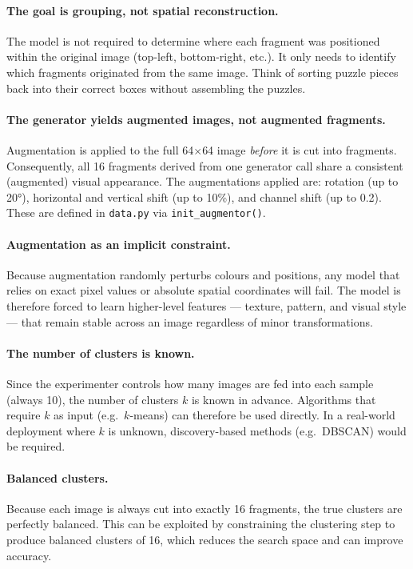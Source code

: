 \documentclass[12pt, a4paper]{article}
\begin{document}
\paragraph{The goal is grouping, not spatial reconstruction.}
The model is not required to determine where each fragment was positioned within the
original image (top-left, bottom-right, etc.). It only needs to identify which fragments
originated from the same image. Think of sorting puzzle pieces back into their correct
boxes without assembling the puzzles.

\paragraph{The generator yields augmented images, not augmented fragments.}
Augmentation is applied to the full 64$\times$64 image \emph{before} it is cut into
fragments. Consequently, all 16 fragments derived from one generator call share
a consistent (augmented) visual appearance. The augmentations applied are:
rotation (up to 20°), horizontal and vertical shift (up to 10\%), and channel shift
(up to 0.2). These are defined in \texttt{data.py} via \texttt{init\_augmentor()}.

\paragraph{Augmentation as an implicit constraint.}
Because augmentation randomly perturbs colours and positions, any model that relies on
exact pixel values or absolute spatial coordinates will fail. The model is therefore
forced to learn higher-level features — texture, pattern, and visual style — that
remain stable across an image regardless of minor transformations.

\paragraph{The number of clusters is known.}
Since the experimenter controls how many images are fed into each sample (always 10),
the number of clusters $k$ is known in advance. Algorithms that require $k$ as input
(e.g.\ $k$-means) can therefore be used directly. In a real-world deployment where
$k$ is unknown, discovery-based methods (e.g.\ DBSCAN) would be required.

\paragraph{Balanced clusters.}
Because each image is always cut into exactly 16 fragments, the true clusters are
perfectly balanced. This can be exploited by constraining the clustering step to
produce balanced clusters of 16, which reduces the search space and can improve
accuracy.
\end{document}
